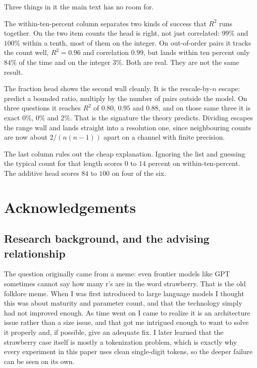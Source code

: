 \documentclass[10pt]{article}
\theoremstyle{definition}
\begin{document}
\begin{appendices}
Three things in it the main text has no room for.

The within-ten-percent column separates two kinds of success that $R^2$ runs
together. On the two item counts the head is right, not just correlated:
$99\%$ and $100\%$ within a tenth, most of them on the integer. On
out-of-order pairs it tracks the count well, $R^2 = 0.96$ and correlation
$0.99$, but lands within ten percent only $84\%$ of the time and on the
integer $3\%$. Both are real. They are not the same result.

The fraction head shows the second wall cleanly. It is the rescale-by-$n$
escape: predict a bounded ratio, multiply by the number of pairs outside the
model. On three questions it reaches $R^2$ of $0.80$, $0.95$ and $0.88$, and
on those same three it is exact $0\%$, $0\%$ and $2\%$. That is the signature
the theory predicts. Dividing escapes the range wall and lands straight into
a resolution one, since neighbouring counts are now about $2/(n(n-1))$ apart
on a channel with finite precision.

The last column rules out the cheap explanation. Ignoring the list and
guessing the typical count for that length scores $0$ to $14$ percent on
within-ten-percent. The additive head scores $84$ to $100$ on four of the
six.

\end{appendices}

\clearpage



\clearpage
\section*{Acknowledgements}

\subsection*{Research background, and the advising relationship}

The question originally came from a meme: even frontier models like GPT
sometimes cannot say how many r's are in the word strawberry. That is the
old folklore meme. When I was first introduced to large language models I
thought this was about maturity and parameter count, and that the
technology simply had not improved enough. As time went on I came to
realize it is an architecture issue rather than a size issue, and that got
me intrigued enough to want to solve it properly and, if possible, give an
adequate fix. I later learned that the strawberry case itself is mostly a
tokenization problem, which is exactly why every experiment in this paper
uses clean single-digit tokens, so the deeper failure can be seen on its
own.
\end{document}
